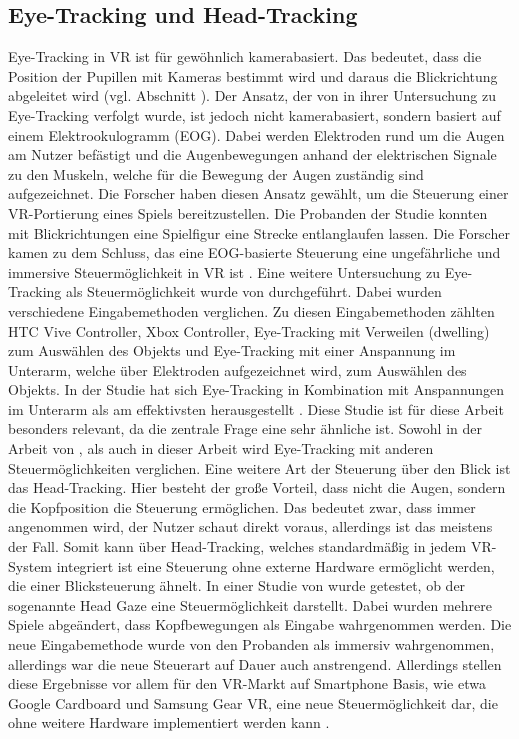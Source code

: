 \subsection{Eye-Tracking und Head-Tracking}
\label{eyetrackingVR}
Eye-Tracking in VR ist für gewöhnlich kamerabasiert. Das bedeutet, dass die Position der Pupillen mit Kameras bestimmt wird und daraus die Blickrichtung abgeleitet wird (vgl. Abschnitt ). Der Ansatz, der von \citeauthor{D.Kumar.2016} in ihrer Untersuchung zu Eye-Tracking verfolgt wurde, ist jedoch nicht kamerabasiert, sondern basiert auf einem Elektrookulogramm (EOG). Dabei werden Elektroden rund um die Augen am Nutzer befästigt und die Augenbewegungen anhand der elektrischen Signale zu den Muskeln, welche für die Bewegung der Augen zuständig sind  aufgezeichnet. Die Forscher haben diesen Ansatz gewählt, um die Steuerung einer VR-Portierung eines Spiels bereitzustellen. Die Probanden der Studie konnten mit Blickrichtungen eine Spielfigur eine Strecke entlanglaufen lassen. Die Forscher kamen zu dem Schluss, das eine EOG-basierte Steuerung eine ungefährliche und immersive Steuermöglichkeit in VR ist \cite{D.Kumar.2016}. 
Eine weitere Untersuchung zu Eye-Tracking als Steuermöglichkeit wurde von \citeauthor{Pai.2019} durchgeführt. Dabei wurden verschiedene Eingabemethoden verglichen. Zu diesen Eingabemethoden zählten HTC Vive Controller, Xbox Controller, Eye-Tracking mit Verweilen (dwelling) zum Auswählen des Objekts und Eye-Tracking mit einer Anspannung im Unterarm, welche über Elektroden aufgezeichnet wird, zum Auswählen des Objekts. In der Studie hat sich Eye-Tracking in Kombination mit Anspannungen im Unterarm als am effektivsten herausgestellt \cite{Pai.2019}. Diese Studie ist für diese Arbeit besonders relevant, da die zentrale Frage eine sehr ähnliche ist. Sowohl in der Arbeit von \citeauthor{Pai.2019}, als auch in dieser Arbeit wird Eye-Tracking mit anderen Steuermöglichkeiten verglichen.
Eine weitere Art der Steuerung über den Blick ist das Head-Tracking. Hier besteht der große Vorteil, dass nicht die Augen, sondern die Kopfposition die Steuerung ermöglichen. Das bedeutet zwar, dass immer angenommen wird, der Nutzer schaut direkt voraus, allerdings ist das meistens der Fall. Somit kann über Head-Tracking, welches standardmäßig in jedem VR-System integriert ist  eine Steuerung ohne externe Hardware ermöglicht werden, die einer Blicksteuerung ähnelt. In einer Studie von \citeauthor{R.Atienza.2016} wurde getestet, ob der sogenannte \glqq Head Gaze\grqq{} eine Steuermöglichkeit darstellt. Dabei wurden mehrere Spiele abgeändert, dass Kopfbewegungen als Eingabe wahrgenommen werden. Die neue Eingabemethode wurde von den Probanden als immersiv wahrgenommen, allerdings war die neue Steuerart auf Dauer auch anstrengend. Allerdings stellen diese Ergebnisse vor allem für den VR-Markt auf Smartphone Basis, wie etwa Google Cardboard und Samsung Gear VR, eine neue Steuermöglichkeit dar, die ohne weitere Hardware implementiert werden kann \cite{R.Atienza.2016}. 

